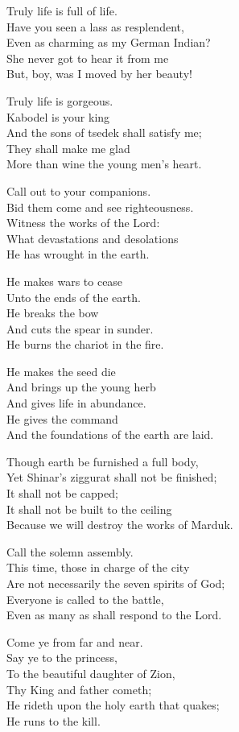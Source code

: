 \documentclass[
]{book}
\begin{document}
Truly life is full of life.\\
Have you seen a lass as resplendent,\\
Even as charming as my German Indian?\\
She never got to hear it from me\\
But, boy, was I moved by her beauty!

Truly life is gorgeous.\\
Kabodel is your king\\
And the sons of tsedek shall satisfy me;\\
They shall make me glad\\
More than wine the young men's heart.

Call out to your companions.\\
Bid them come and see righteousness.\\
Witness the works of the Lord:\\
What devastations and desolations\\
He has wrought in the earth.

He makes wars to cease\\
Unto the ends of the earth.\\
He breaks the bow\\
And cuts the spear in sunder.\\
He burns the chariot in the fire.

He makes the seed die\\
And brings up the young herb\\
And gives life in abundance.\\
He gives the command\\
And the foundations of the earth are laid.

Though earth be furnished a full body,\\
Yet Shinar's ziggurat shall not be finished;\\
It shall not be capped;\\
It shall not be built to the ceiling\\
Because we will destroy the works of Marduk.

Call the solemn assembly.\\
This time, those in charge of the city\\
Are not necessarily the seven spirits of God;\\
Everyone is called to the battle,\\
Even as many as shall respond to the Lord.

Come ye from far and near.\\
Say ye to the princess,\\
To the beautiful daughter of Zion,\\
Thy King and father cometh;\\
He rideth upon the holy earth that quakes;\\
He runs to the kill.
\end{document}
